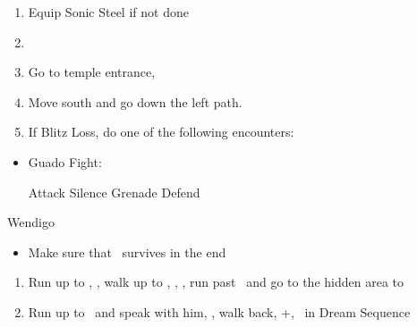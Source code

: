 \begin{enumerate}[resume]
	\item Equip Sonic Steel if not done
	\item \formation{\tidus}{\rikku}{\yuna}
	\item Go to temple entrance, \sd
	\item Move south and go down the left path.
	\item If Blitz Loss, do one of the following encounters:
\end{enumerate}
\begin{encounters}
\begin{itemize}
	\item Guado Fight:
	\begin{itemize}
		\tidusf Attack
		\rikkuf Silence Grenade
		\yunaf Defend
	\end{itemize}
\end{itemize}
\end{encounters}
\begin{battle}[18000]{Wendigo}
\begin{itemize}
	\tidusf Haste \tidus
	\tidusf Switch Weapon to Brotherhood
	\tidusf Attack Guado B
	\rikkuf Light Curtain \tidus
	\tidusf Attack Wendigo
	\yunaf Defend/Heal \tidus/Phoenix Down Dead Ally
	\rikkuf Defend/Heal \tidus/Steal Guado/Phoenix Down Dead Ally
	\switch{\yuna}{\auron}
	\item Make sure that \yuna\ survives in the end
\end{itemize}
\end{battle}
\begin{enumerate}[resume]
	\item Run up to \rikku, \sd, walk up to \yuna, \sd, \save, run past \kimahri\ and go to the hidden area to 
	\item Run up to \auron\ and speak with him, \sd, walk back, \cs+\skippablefmv[1:00], \sd\ in Dream Sequence
\end{enumerate}

